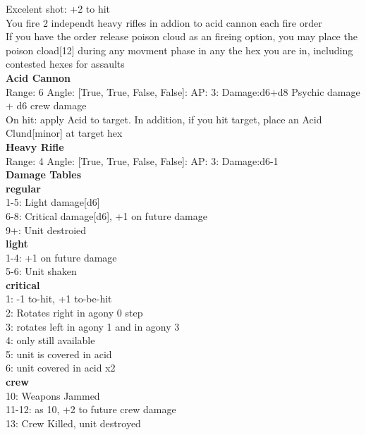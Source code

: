 Excelent shot: +2 to hit\\ 
You fire 2 independt heavy rifles in addion to acid cannon each fire order\\ 
If you have the order release poison cloud as an fireing option, you may place the poison cload[12] during any movment phase in any the hex you are in, including contested hexes for assaults\\ 


{\bf Acid Cannon } \\



Range: 6  Angle: [True, True, False, False]: AP: 3: Damage:d6+d8 Psychic damage + d6 crew damage \\
On hit: apply Acid to target. In addition, if you hit target, place an Acid Clund[minor] at target hex\\ 




{\bf Heavy Rifle } \\



Range: 4  Angle: [True, True, False, False]: AP: 3: Damage:d6-1 \\




 





{\bf Damage Tables} \\
 {\bf regular } \\
1-5: Light damage[d6] \\
6-8: Critical damage[d6], +1 on future damage \\
9+: Unit destroied \\
 {\bf light } \\
1-4: +1 on future damage \\
5-6: Unit shaken \\
 {\bf critical } \\
1: -1 to-hit, +1 to-be-hit \\
2: Rotates right in agony 0 step \\
3: rotates left in agony 1 and in agony 3 \\
4: only still available \\
5: unit is covered in acid \\
6: unit covered in acid x2 \\
 {\bf crew } \\
10: Weapons Jammed \\
11-12: as 10, +2 to future crew damage \\
13: Crew Killed, unit destroyed \\










